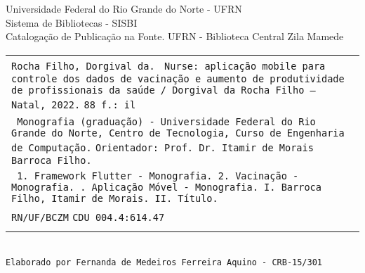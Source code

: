 %
%

\newpage

\begin{center}
  \vspace*{\fill}
  \fontsize{10}{12}\selectfont
  
  \textsf{Universidade Federal do Rio Grande do Norte - UFRN \\
  Sistema de Bibliotecas - SISBI \\
  Catalogação de Publicação na Fonte. UFRN - Biblioteca Central Zila Mamede}
  
  \vspace{2ex}
  
  \begin{minipage}[c]{12.5cm}
    \begin{tabular}{|p{\linewidth}|} \hline \texttt{Rocha Filho, Dorgival da.} \linebreak
    \texttt{\hspace*{1em} Nurse: aplicação mobile para controle dos dados de vacinação \linebreak
    e aumento de produtividade de profissionais da saúde / Dorgival \linebreak
    da Rocha Filho -- Natal, 2022.} \linebreak
    \hspace*{1em} \texttt{88 f.: il}
    \\[1ex]
    \texttt{\hspace{1em} Monografia (graduação) - Universidade Federal do Rio Grande \linebreak
    do Norte, Centro de Tecnologia, Curso de Engenharia de \linebreak Computação.} \linebreak
    \hspace*{1em} \texttt{Orientador: Prof. Dr. Itamir de Morais Barroca Filho.}
    \\[3ex]
    \texttt{\hspace{1em} 1. Framework Flutter - Monografia. 2. Vacinação - Monografia. \linebreak 3. Aplicação Móvel - Monografia.
    I. Barroca Filho, Itamir de \linebreak Morais.
    II. Título.}
    \\
    \texttt{RN/UF/BCZM} \hfill \texttt{CDU 004.4:614.47} \hspace{3cm} \\
    \\
    \hline
    \end{tabular} 
    \\[3ex]
    \texttt{Elaborado por Fernanda de Medeiros Ferreira Aquino - CRB-15/301}
  \normalsize
  \end{minipage}
\end{center}
\vspace{4cm}

